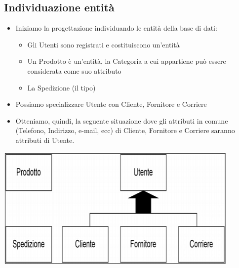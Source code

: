 \subsection{Individuazione entità}
\begin{itemize}
	\item Iniziamo la progettazione individuando le entità della base di dati:
	\begin{itemize}
		\item Gli Utenti sono registrati e costituiscono un’entità
		\item Un Prodotto è un’entità, la Categoria a cui appartiene può essere considerata come suo attributo
		\item La Spedizione (il tipo)
	\end{itemize}
	\item Possiamo specializzare Utente con Cliente, Fornitore e Corriere
	\item Otteniamo, quindi, la seguente situazione dove gli attributi in comune (Telefono, Indirizzo, e-mail, ecc) di Cliente, Fornitore e Corriere saranno attributi di
	Utente.
\end{itemize}
\begin{center}
	\includegraphics{images/86.PNG}
\end{center}
